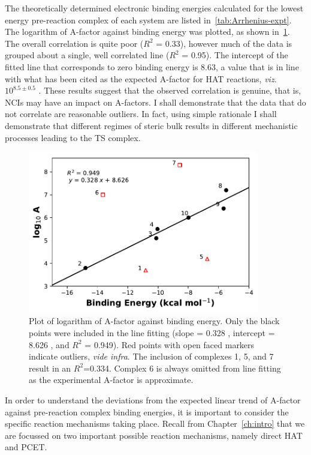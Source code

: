 \begin{doublespace}
The theoretically determined electronic binding energies calculated for the
lowest energy pre-reaction complex of each system are listed
in~\ref{tab:Arrhenius-expt}. The logarithm of A-factor against binding energy
was plotted, as shown in~\ref{fig:Arrhenius}. The overall correlation is quite
poor ($R^2$ = 0.33), however much of the data is grouped about a single, well
correlated line ($R^2$ = 0.95). The intercept of the fitted line that
corresponds to zero binding energy is 8.63, a value that is in line with what
has been cited as the expected A-factor for HAT reactions, \emph{viz.
}$10^{8.5\pm0.5}$ \Ms.\cite{Benson1976} These results suggest that the observed
correlation is genuine, that is, NCIs may have an impact on A-factors. I shall
demonstrate that the data that do not correlate are reasonable outliers. In
fact, using simple rationale I shall demonstrate that different regimes of
steric bulk results in different mechanistic processes leading to the TS
complex.

\begin{figure}[!htbp]
  \centering
  \includegraphics[width=0.9\textwidth]{figures/arrhenius-scatter.pdf}
  \caption[Plot of logarithm of A-factor against binding energy.]{Plot of
  logarithm of A-factor against binding energy. Only the black points were
  included in the line fitting (slope = 0.328 \kcalmol, intercept = 8.626
  \kcalmol, and $R^2$ = 0.949). Red points with open faced markers indicate
  outliers, \emph{vide infra}. The inclusion of complexes 1, 5, and 7 result in
  an $R^2$=0.334. Complex 6 is always omitted from line fitting as the
  experimental A-factor is approximate.}
  \label{fig:Arrhenius}
\end{figure}

In order to understand the deviations from the expected linear trend of A-factor
against pre-reaction complex binding energies, it is important to consider the
specific reaction mechanisms taking place. Recall from Chapter~\ref{ch:intro}
that we are focussed on two important possible reaction mechanisms, namely
direct HAT and PCET.


\end{doublespace}
